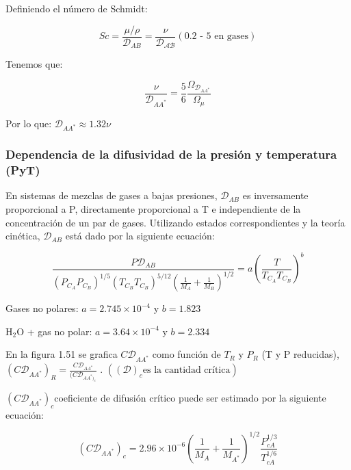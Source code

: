 Definiendo el número de Schmidt:

\begin{equation}
Sc = \frac{\mu / \rho}{\mathscr{D}_{AB}} = \frac{\nu}{\mathscr{D_{AB}}} (\text{0.2 - 5 en gases}) \tag{1.51}\label{eq_1.51}
\end{equation}

Tenemos que:

\begin{equation}
\frac{\nu}{\mathscr{D}_{AA^*}} = \frac{5}{6}\frac{\Omega_{\mathscr{D}_{AA^*}}}{ \Omega_\mu}\tag{1.52}\label{eq_1.52}
\end{equation}

Por lo que: $\mathscr{D}_{AA^*} \approx 1.32 \nu$
\subsubsection{Dependencia de la difusividad de la presión y temperatura (PyT)}
En sistemas de mezclas de gases a bajas presiones,  $\mathscr{D}_{AB}$ es inversamente proporcional a P, directamente proporcional a T e independiente de la concentración de un par de gases.
Utilizando estados correspondientes y la teoría cinética, \( \mathscr{D}_{AB} \) está dado por la siguiente ecuación:

\begin{equation}
\frac{P \mathscr{D}_{AB}}{(P_{C_A} P_{C_{B}})^{1/5} (T_{{C_B}} T_{C_{B}})^{5/12} \left( \frac{1}{M_A} + \frac{1}{M_B} \right)^{1/2}} = a \left( \frac{T}{T_{C_A} T_{C_B}} \right)^b\tag{1.53}\label{eq_1.53}
\end{equation}

Gases no polares: \( a = 2.745 \times 10^{-4} \) y \( b = 1.823 \)  

H$_2$O + gas no polar: \( a = 3.64 \times 10^{-4} \) y \( b = 2.334 \)

En la figura 1.51 se grafica \( C \mathscr{D}_{AA^*}\) como función de \( T_R \) y \( P_R \) (T y P reducidas), \( (C \mathscr{D}_{AA^*})_R=\frac{C\mathscr{D}_{AA^*}}{(C\mathscr{D}_{AA^*)_c}} \) .
$((\mathscr{D})_c \text{es la cantidad crítica})$

$(C\mathscr{D}_{AA^*})_c$coeficiente de difusión crítico puede ser estimado por la siguiente ecuación:

\begin{equation}
(C\mathscr{D}_{AA^*})_c = 2.96 \times 10^{-6} \left( \frac{1}{M_A} + \frac{1}{M_{A^*}} \right)^{1/2} \frac{P_{cA}^{1/3}}{T_{cA}^{1/6}}\tag{1.54}\label{eq_1.54}
\end{equation}

